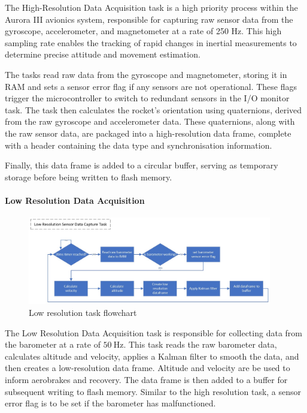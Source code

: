 The High-Resolution Data Acquisition task is a high priority process within the Aurora III avionics system, responsible for capturing raw sensor data from the gyroscope, accelerometer, and magnetometer at a rate of 250 Hz. This high sampling rate enables the tracking of rapid changes in inertial measurements to determine precise attitude and movement estimation. 

The tasks read raw data from the gyroscope and magnetometer, storing it in RAM and sets a sensor error flag if any sensors are not operational. These flags trigger the microcontroller to switch to redundant sensors in the I/O monitor task. The task then calculates the rocket's orientation using quaternions, derived from the raw gyroscope and accelerometer data. These quaternions, along with the raw sensor data, are packaged into a high-resolution data frame, complete with a header containing the data type and synchronisation information. 

Finally, this data frame is added to a circular buffer, serving as temporary storage before being written to flash memory.  

 
\paragraph{Low Resolution Data Acquisition}
\begin{figure}[ht!]
  \begin{center}
    \includegraphics[width=0.95\textwidth]{./img/Section_4_2_2_2.jpeg}
  \end{center}
  \caption{Low resolution task flowchart}\label{fig:flowchart-low_res}
\end{figure}

The Low Resolution Data Acquisition task is responsible for collecting data from the barometer at a rate of $\SI{50}{\hertz}$. This task reads the raw barometer data, calculates altitude and velocity, applies a Kalman filter to smooth the data, and then creates a low-resolution data frame. Altitude and velocity are be used to inform aerobrakes and recovery. The data frame is then added to a buffer for subsequent writing to flash memory. Similar to the high resolution task, a sensor error flag is to be set if the barometer has malfunctioned.  

